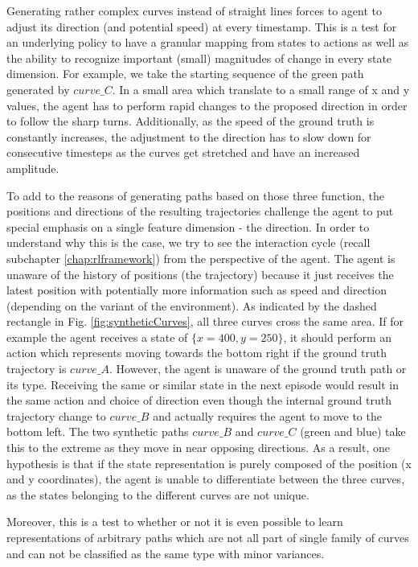 Generating rather complex curves instead of straight lines forces to agent to adjust its direction (and potential speed) at every timestamp. This is a test for an underlying policy to have a granular mapping from states to actions as well as the ability to recognize important (small) magnitudes of change in every state dimension. For example, we take the starting sequence of the green path generated by $curve\_C$. In a small area which translate to a small range of x and y values, the agent has to perform rapid changes to the proposed direction in order to follow the sharp turns. Additionally, as the speed of the ground truth is constantly increases, the adjustment to the direction has to slow down for consecutive timesteps as the curves get stretched and have an increased amplitude.
\par
To add to the reasons of generating paths based on those three function, the positions and directions of the resulting trajectories challenge the agent to put special emphasis on a single feature dimension - the direction.  In order to understand why this is the case, we try to see the interaction cycle (recall subchapter \ref{chap:rlframework}) from the perspective of the agent. The agent is unaware of the history of positions (the trajectory) because it just receives the latest position with potentially more information such as speed and direction (depending on the variant of the environment). As indicated by the dashed rectangle in Fig. \ref{fig:syntheticCurves}, all three curves cross the same area. If for example the agent receives a state of $\{x=400, y=250\}$, it should perform an action which represents moving towards the bottom right if the ground truth trajectory is $curve\_A$. However, the agent is unaware of the ground truth path or its type. Receiving the same or similar state in the next episode would result in the same action and choice of direction even though the internal ground truth trajectory change to $curve\_B$ and actually requires the agent to move to the bottom left. The two synthetic paths $curve\_B$ and $curve\_C$ (green and blue) take this to the extreme as they move in near opposing directions. As a result, one hypothesis is that if the state representation is purely composed of the position (x and y coordinates), the agent is unable to differentiate between the three curves, as the states belonging to the different curves are not unique.
\par
Moreover, this is a test to whether or not it is even possible to learn representations of arbitrary paths which are not all part of single family of curves and can not be classified as the same type with minor variances.
